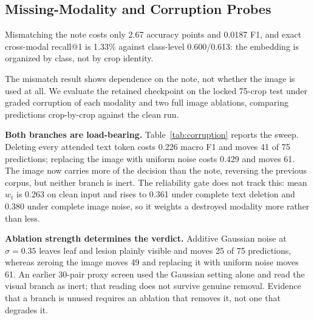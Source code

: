 \documentclass[conference]{IEEEtran}
\begin{document}
\subsection{Missing-Modality and Corruption Probes}
\label{sec:modality_inertness}

Mismatching the note costs only 2.67 accuracy points and 0.0187 F1, and exact
cross-modal recall@1 is 1.33\% against class-level 0.600/0.613: the embedding is
organized by class, not by crop identity.




The mismatch result shows dependence on the note, not whether the image is used
at all. We evaluate the retained checkpoint on the locked 75-crop test under
graded corruption of each modality and two full image ablations, comparing
predictions crop-by-crop against the clean run.

\textbf{Both branches are load-bearing.} Table~\ref{tab:corruption} reports the
sweep. Deleting every attended text token costs 0.226 macro F1 and moves
41 of 75 predictions; replacing the image with uniform noise costs 0.429
and moves 61. The image now carries more of the decision than the note,
reversing the previous corpus, but neither branch is inert. The reliability gate
does not track this: mean $w_t$ is 0.263 on clean input and rises to 0.361
under complete text deletion and 0.380 under complete image noise, so it
weights a destroyed modality more rather than less.

\textbf{Ablation strength determines the verdict.} Additive Gaussian noise at
$\sigma{=}0.35$ leaves leaf and lesion plainly visible and moves 25 of 75
predictions, whereas zeroing the image moves 49 and replacing it with uniform
noise moves 61. An earlier 30-pair proxy screen used the Gaussian setting alone
and read the visual branch as inert; that reading does not survive genuine
removal. Evidence that a branch is unused requires an ablation that removes it,
not one that degrades it.



\end{document}
